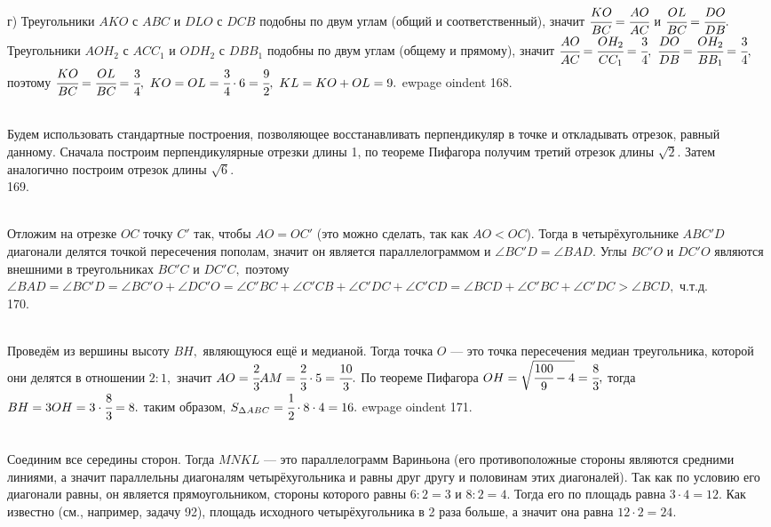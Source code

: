 г) Треугольники $AKO$ с $ABC$ и $DLO$ с $DCB$ подобны по двум углам (общий и соответственный), значит $\cfrac{KO}{BC}=\cfrac{AO}{AC}$ и $\cfrac{OL}{BC}=\cfrac{DO}{DB}.$ Треугольники $AOH_2$ с $ACC_1$ и $ODH_2$ с $DBB_1$ подобны по двум углам (общему и прямому), значит $\cfrac{AO}{AC}=\cfrac{OH_2}{CC_1}=\cfrac{3}{4},\ \cfrac{DO}{DB}=\cfrac{OH_2}{BB_1}=\cfrac{3}{4},$ поэтому $\cfrac{KO}{BC}=\cfrac{OL}{BC}=\cfrac{3}{4},\
KO=OL=\cfrac{3}{4}\cdot6=\cfrac{9}{2},\ KL=KO+OL=9.$
ewpage
oindent
168. \begin{figure}[ht!]
\end{figure}\\
Будем использовать стандартные построения, позволяющее восстанавливать перпендикуляр в точке и откладывать отрезок, равный данному. Сначала построим перпендикулярные отрезки длины 1, по теореме Пифагора получим третий отрезок длины $\sqrt{2}.$ Затем аналогично построим отрезок длины $\sqrt{6}.$\\
169. \begin{figure}[ht!]
\end{figure}\\
Отложим на отрезке $OC$ точку $C'$ так, чтобы $AO=OC'$ (это можно сделать, так как $AO<OC$). Тогда в четырёхугольнике $ABC'D$ диагонали делятся точкой пересечения пополам, значит он является параллелограммом и $\angle BC'D=\angle BAD.$ Углы $BC'O$ и $DC'O$ являются внешними в треугольниках $BC'C$ и $DC'C,$ поэтому $\angle BAD=\angle BC'D=\angle BC'O+\angle DC'O=\angle C'BC+\angle C'CB+\angle C'DC+\angle C'CD=\angle BCD+\angle C'BC+\angle C'DC>\angle BCD,$ ч.т.д.\\
170. \begin{figure}[ht!]
\end{figure}\\
Проведём из вершины высоту $BH,$ являющуюся ещё и медианой. Тогда точка $O$ --- это точка пересечения медиан треугольника, которой они делятся в отношении $2:1,$ значит $AO=\cfrac{2}{3}AM=\cfrac{2}{3}\cdot5=\cfrac{10}{3}.$ По теореме Пифагора $OH=\sqrt{\cfrac{100}{9}-4}=\cfrac{8}{3},$ тогда $BH=3OH=3\cdot\cfrac{8}{3}=8.$ таким образом, $S_{\Delta ABC}=\cfrac{1}{2}\cdot8\cdot4=16.$
ewpage
oindent
171. \begin{figure}[ht!]
\end{figure}\\
Соединим все середины сторон. Тогда $MNKL$ --- это параллелограмм Вариньона (его противоположные стороны являются средними линиями, а значит параллельны диагоналям четырёхугольника и равны друг другу и половинам этих диагоналей). Так как по условию его диагонали равны, он является прямоугольником, стороны которого равны $6:2=3$ и $8:2=4.$ Тогда его по площадь равна $3\cdot4=12.$ Как известно (см., например, задачу 92), площадь исходного четырёхугольника в 2 раза больше, а значит она равна $12\cdot2=24.$\\

